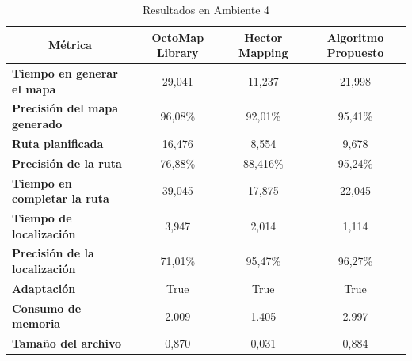 \begin{table}[H]
\centering
\begin{tabular}{@{}lccc@{}}
\toprule
\multicolumn{1}{|c|}{\textbf{Métrica}} &
  \multicolumn{1}{c|}{\textbf{OctoMap Library}} &
  \multicolumn{1}{c|}{\textbf{Hector Mapping}} &
  \multicolumn{1}{c|}{\textbf{Algoritmo Propuesto}} \\ \midrule
\multicolumn{1}{|l|}{\textbf{Tiempo en generar el mapa}}    & \multicolumn{1}{c|}{29,041} & \multicolumn{1}{c|}{11,237} & \multicolumn{1}{c|}{21,998} \\ \midrule
\multicolumn{1}{|l|}{\textbf{Precisión del mapa generado}}  & \multicolumn{1}{c|}{96,08\%} & \multicolumn{1}{c|}{92,01\%} & \multicolumn{1}{c|}{95,41\%} \\ \midrule
\multicolumn{1}{|l|}{\textbf{Ruta planificada}}             & \multicolumn{1}{c|}{16,476} & \multicolumn{1}{c|}{8,554} & \multicolumn{1}{c|}{9,678} \\ \midrule
\multicolumn{1}{|l|}{\textbf{Precisión de la ruta}}         & \multicolumn{1}{c|}{76,88\%} & \multicolumn{1}{c|}{88,416\%} & \multicolumn{1}{c|}{95,24\%} \\ \midrule
\multicolumn{1}{|l|}{\textbf{Tiempo en completar la ruta}}  & \multicolumn{1}{c|}{39,045} & \multicolumn{1}{c|}{17,875} & \multicolumn{1}{c|}{22,045} \\ \midrule
\multicolumn{1}{|l|}{\textbf{Tiempo de localización}}       & \multicolumn{1}{c|}{3,947} & \multicolumn{1}{c|}{2,014} & \multicolumn{1}{c|}{1,114} \\ \midrule
\multicolumn{1}{|l|}{\textbf{Precisión de la localización}} & \multicolumn{1}{c|}{71,01\%} & \multicolumn{1}{c|}{95,47\%} & \multicolumn{1}{c|}{96,27\%} \\ \midrule
\multicolumn{1}{|l|}{\textbf{Adaptación}}                   & \multicolumn{1}{c|}{True} & \multicolumn{1}{c|}{True} & \multicolumn{1}{c|}{True} \\ \midrule
\multicolumn{1}{|l|}{\textbf{Consumo de memoria}}           & \multicolumn{1}{c|}{2.009} & \multicolumn{1}{c|}{1.405} & \multicolumn{1}{c|}{2.997} \\ \midrule
\multicolumn{1}{|l|}{\textbf{Tamaño del archivo}}           & \multicolumn{1}{c|}{0,870} & \multicolumn{1}{c|}{0,031} & \multicolumn{1}{c|}{0,884} \\ \bottomrule
\end{tabular}
\caption{Resultados en Ambiente 4}
\label{tab:resultados_ambiente_4}
\end{table}

